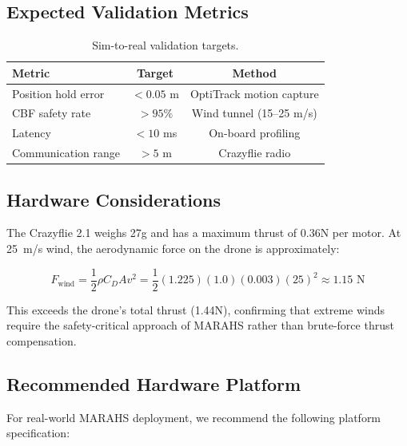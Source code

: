 \documentclass[12pt,a4paper]{article}
\begin{document}
\subsection{Expected Validation Metrics}

\begin{table}[t]
\centering
\caption{Sim-to-real validation targets.}
\label{tab:sim2real}
\begin{tabular}{lcc}
\toprule
\textbf{Metric} & \textbf{Target} & \textbf{Method} \\
\midrule
Position hold error & $< 0.05$ m & OptiTrack motion capture \\
CBF safety rate & $> 95\%$ & Wind tunnel (15--25 m/s) \\
Latency & $< 10$ ms & On-board profiling \\
Communication range & $> 5$ m & Crazyflie radio \\
\bottomrule
\end{tabular}
\end{table}

\subsection{Hardware Considerations}

The Crazyflie 2.1 weighs 27g and has a maximum thrust of 0.36N per motor. At 25~m/s wind, the aerodynamic force on the drone is approximately:

\begin{equation}
    F_{\text{wind}} = \frac{1}{2} \rho C_D A v^2 = \frac{1}{2}(1.225)(1.0)(0.003)(25)^2 \approx 1.15\text{ N}
\end{equation}

This exceeds the drone's total thrust (1.44N), confirming that extreme winds require the safety-critical approach of MARAHS rather than brute-force thrust compensation.

\subsection{Recommended Hardware Platform}

For real-world MARAHS deployment, we recommend the following platform specification:
\end{document}
